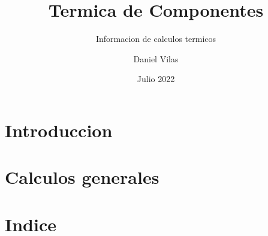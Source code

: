 \documentclass[spanish]{DccDiyTools/DccDiyTools}
\title{Termica de Componentes}
\subtitle{Informacion de calculos termicos}
\author{Daniel Vilas}
\date{Julio 2022}
\begin{document}
\maketitle
\newpage
\section{Introduccion}


\newpage
\section{Calculos generales}


\newpage
\section{Indice}
\tableofcontents

\listoffigures
\listoftables
\end{document}
